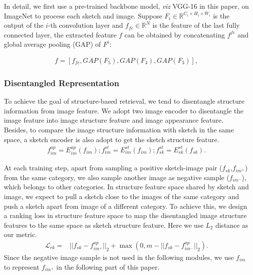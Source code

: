 \documentclass[10pt,twocolumn,letterpaper]{article}
\begin{document}
In detail, we first use a pre-trained backbone model, \textit{viz} VGG-16 in this paper, on ImageNet \cite{deng2009imagenet} to process each sketch and image. 
Suppose $F_i \in \mathbb{R}^{C_i \times H_i \times W_i}$ is the output of the $i$-th convolution layer and $f_{fc} \in \mathbb{R}^{N}$ is the feature of the last fully connected layer, the extracted feature $f$ can be obtained by concatenating $f^{fc}$ and global average pooling (GAP) of $F^i$:

\begin{align}
f\!=\![f_{fc}, GAP(F_5), GAP(F_4), GAP(F_3)],
\end{align}

\subsubsection{Disentangled Representation}
To achieve the goal of structure-based retrieval, we tend to disentangle structure information from image feature. 
We adopt two image encoder to disentangle the image feature into image structure feature and image appearance feature. Besides, to compare the image structure information with sketch in the same space, a sketch encoder is also adopt to get the sketch structure feature. 
\begin{align}
    f_{im}^{ap} \!=\! E_{im}^{ap}(f_{im}); f_{im}^{st} \!=\! E_{im}^{st}(f_{im}); f_{sk}^{st} \!=\! E_{sk}^{st}(f_{sk}).
\end{align}

At each training step, apart from sampling a positive sketch-image pair ($f_{sk}$,$f_{im^{+}}$) from the same category, we also sample another image as negative sample ($f_{im^{-}}$), which belongs to other categories. In structure feature space shared by sketch and image, we expect to pull a sketch close to the images of the same category and push a sketch apart from image of a different category. To achieve this, we design a ranking loss in structure feature space to map the disentangled image structure features to the same space as sketch structure feature. Here we use $L_2$ distance as our metric.
\begin{equation}
    \begin{aligned}
        \mathcal{L}_{rk} =& ||f_{sk}\!-\!f_{im^{\!+\!}}^{ap}||_{2}\!+\!\max(0,\!m\!-\!||f_{sk}\!-\!f_{im^{\!-\!}}^{ap}||_{2}).
    \end{aligned}
\end{equation}
Since the negative image sample is not used in the following modules, we use $f_{im}$ to represent $f_{im^{+}}$ in the following part of this paper.
\end{document}
